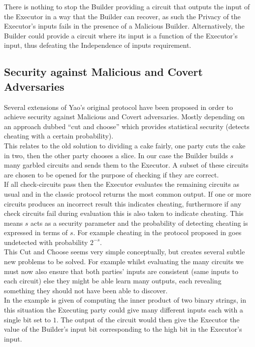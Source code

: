 \documentclass[a4paper,11pt]{article}
\begin{document}
			There is nothing to stop the Builder providing a circuit that outputs the input of the Executor in a way that the Builder can recover, as such the Privacy of the Executor's inputs fails in the presence of a Malicious Builder. Alternatively, the Builder could provide a circuit where its input is a function of the Executor's input, thus defeating the Independence of inputs requirement.


		\subsection{Security against Malicious and Covert Adversaries} \label{sub:YaoMalicious}
			Several extensions of Yao's original protocol have been proposed in order to achieve security against Malicious and Covert adversaries. Mostly depending on an approach dubbed ``cut and choose'' which provides statistical security (detects cheating with a certain probability).\\

			This relates to the old solution to dividing a cake fairly, one party cuts the cake in two, then the other party chooses a slice. In our case the Builder builds $s$ many garbled circuits and sends them to the Executor. A subset of these circuits are chosen to be opened for the purpose of checking if they are correct.\\

			If all check-circuits pass then the Executor evaluates the remaining circuits as usual and in the classic protocol returns the most common output. If one or more circuits produces an incorrect result this indicates cheating, furthermore if any check circuits fail during evaluation this is also taken to indicate cheating. This means $s$ acts as a security parameter and the probability of detecting cheating is expressed in terms of $s$. For example cheating in the protocol proposed in \cite{Lindell_CnC_2013} goes undetected with probability $2^{-s}$.\\

			This Cut and Choose seems very simple conceptually, but creates several subtle new problems to be solved. For example whilst evaluating the many circuits we must now also ensure that both parties' inputs are consistent (same inputs to each circuit) else they might be able learn many outputs, each revealing something they should not have been able to discover.\\

			In \cite{LindellAndPinkas2007} the example is given of computing the inner product of two binary strings, in this situation the Executing party could give many different inputs each with a single bit set to $1$. The output of the circuit would then give the Executor the value of the Builder's input bit corresponding to the high bit in the Executor's input.\\
\end{document}
